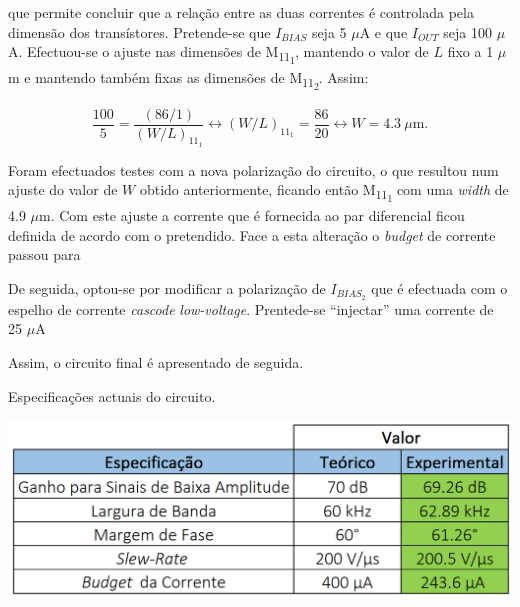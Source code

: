 \documentclass[11pt]{article}
\numberwithin{equation}{section}
\begin{document}
\vspace{1mm}
que permite concluir que a relação entre as duas correntes é controlada pela dimensão dos transístores. Pretende-se que $I_{BIAS}$ seja 5 $\mu$A e que $I_{OUT}$ seja 100 $\mu$A. Efectuou-se o ajuste nas dimensões de M\textsubscript{11\textsubscript{1}}, mantendo o valor de $L$ fixo a 1 $\mu$m e mantendo também fixas as dimensões de M\textsubscript{11\textsubscript{2}}. Assim:

\vspace{-2mm}
\begin{equation}
\frac{100}{5} = \frac{\left(86/1\right)}{\left(W/L\right)_{11_{1}}} \leftrightarrow \left(W/L\right)_{11_{1}} = \frac{86}{20} \leftrightarrow W = 4.3~\mu\text{m}.
\end{equation}

\vspace{1mm}
Foram efectuados testes com a nova polarização do circuito, o que resultou num ajuste do valor de $W$ obtido anteriormente, ficando então M\textsubscript{11\textsubscript{1}} com uma \textit{width} de 4.9 $\mu$m. Com este ajuste a corrente que é fornecida ao par diferencial ficou definida de acordo com o pretendido. Face a esta alteração o \textit{budget} de corrente passou para 

De seguida, optou-se por modificar a polarização de $I_{BIAS_{2}}$ que é efectuada com o espelho de corrente \textit{cascode} \textit{low-voltage}. Prentede-se ``injectar'' uma corrente de 25 $\mu$A 

Assim, o circuito final é apresentado de seguida.


\begin{table}[H]
	\centering
	\caption{Especificações actuais do circuito.}
	\vspace{-1.5mm}
	\includegraphics[keepaspectratio=true, scale=0.40]{teoricas/tabsemarea}
\end{table}
\end{document}
